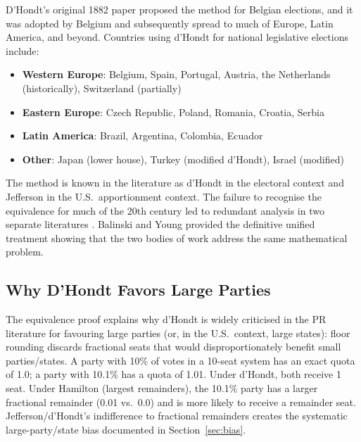 D'Hondt's original 1882 paper \citep{dhondt1882systeme} proposed the
method for Belgian elections, and it was adopted by Belgium and
subsequently spread to much of Europe, Latin America, and beyond.
Countries using d'Hondt for national legislative elections include:
\begin{itemize}
  \item \textbf{Western Europe}: Belgium, Spain, Portugal, Austria,
    the Netherlands (historically), Switzerland (partially)
  \item \textbf{Eastern Europe}: Czech Republic, Poland, Romania,
    Croatia, Serbia
  \item \textbf{Latin America}: Brazil, Argentina, Colombia, Ecuador
  \item \textbf{Other}: Japan (lower house), Turkey (modified d'Hondt),
    Israel (modified)
\end{itemize}
The method is known in the literature as d'Hondt in the electoral
context and Jefferson in the U.S.\ apportionment context.
The failure to recognise the equivalence for much of the 20th century
led to redundant analysis in two separate literatures
\citep{balinski1982fair, lijphart1994electoral}.
Balinski and Young \citeyearpar{balinski1982fair} provided the
definitive unified treatment showing that the two bodies of work
address the same mathematical problem.

\subsection{Why D'Hondt Favors Large Parties}

The equivalence proof explains why d'Hondt is widely criticised
in the PR literature for favouring large parties (or, in the U.S.\
context, large states):
floor rounding discards fractional seats that would disproportionately
benefit small parties/states.
A party with 10\% of votes in a 10-seat system has an exact quota of 1.0;
a party with 10.1\% has a quota of 1.01.
Under d'Hondt, both receive 1 seat.
Under Hamilton (largest remainders), the 10.1\% party has a
larger fractional remainder (0.01 vs.\ 0.0) and is more likely to
receive a remainder seat.
Jefferson/d'Hondt's indifference to fractional remainders creates
the systematic large-party/state bias documented in Section~\ref{sec:bias}.
